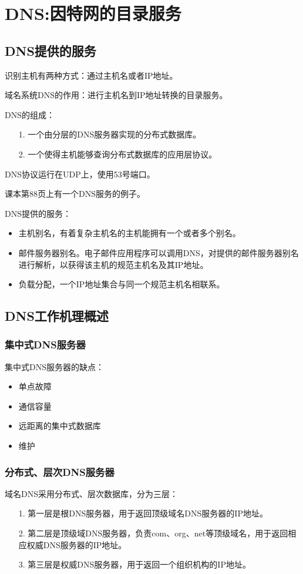 \documentclass[a4paper,left=2.5cm,right=2.5cm,11pt]{article}
\begin{document}
\section{DNS:因特网的目录服务}
\subsection{DNS提供的服务}
	识别主机有两种方式：通过主机名或者IP地址。\par

	域名系统DNS的作用：进行主机名到IP地址转换的目录服务。\par

	DNS的组成：
	\begin{itemize}
		\item[1.] 一个由分层的DNS服务器实现的分布式数据库。
		\item[2.] 一个使得主机能够查询分布式数据库的应用层协议。
	\end{itemize}

	DNS协议运行在UDP上，使用53号端口。\par

	课本第88页上有一个DNS服务的例子。\par

	DNS提供的服务：
	\begin{itemize}
		\item 主机别名，有着复杂主机名的主机能拥有一个或者多个别名。
		\item 邮件服务器别名。电子邮件应用程序可以调用DNS，对提供的邮件服务器别名进行解析，以获得该主机的规范主机名及其IP地址。
		\item 负载分配，一个IP地址集合与同一个规范主机名相联系。
	\end{itemize}

\subsection{DNS工作机理概述}
\subsubsection{集中式DNS服务器}
	集中式DNS服务器的缺点：
	\begin{itemize}
		\item 单点故障
		\item 通信容量
		\item 远距离的集中式数据库
		\item 维护
	\end{itemize}

\subsubsection{分布式、层次DNS服务器}
	域名DNS采用分布式、层次数据库，分为三层：
	\begin{itemize}
		\item[1.] 第一层是根DNS服务器，用于返回顶级域名DNS服务器的IP地址。
		\item[2.] 第二层是顶级域DNS服务器，负责com、org、net等顶级域名，用于返回相应权威DNS服务器的IP地址。
		\item[3.] 第三层是权威DNS服务器，用于返回一个组织机构的IP地址。
	\end{itemize}
\end{document}

